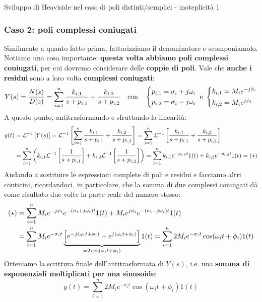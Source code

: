 \begin{defin}{Sviluppo di Heaviside nel caso di poli distinti/semplici - moteplicità 1}{}
\subsubsection{Caso 2: poli complessi coniugati}
Similmente a quanto fatto prima, fattorizziamo il denominatore e scomponiamolo. Notiamo una cosa importante: \textbf{questa volta abbiamo poli complessi coniugati}, per cui dovremo considerare delle \textbf{coppie di poli}. Vale che \textbf{anche i residui} sono a loro volta \textbf{complessi coniugati}:
\begin{equation}
Y(s) = \frac{N(s)}{D(s)} = \sum_{i=1}^n \frac{k_{i,1}}{s+p_{i,1}} + \frac{k_{i,2}}{s+p_{i,2}} \quad \textrm{con} \quad \begin{dcases}p_{i,1} = \sigma_i + j\omega_i \\
	p_{i,2} = \sigma_i -j\omega_i
 \end{dcases} \ \textrm{e} \ \begin{dcases}
 k_{i,1} = M_i e^{-j\phi_i} \\
k_{i,2} = M_i e^{j\phi_i}
 \end{dcases}
\end{equation}
A questo punto, antitrasformando e sfruttando la linearità:
\begin{align*}
y(t) & = \mathcal{L}^{-1}\left[ Y(s) \right] = \mathcal{L}^{-1}\left[ \sum_{i=1}^n \frac{k_{i,1}}{s+p_{i,1}} + \frac{k_{i,2}}{s+p_{i,2}} \right] = \sum_{i=1}^n \mathcal{L}^{-1}\left[ \frac{k_{i,1}}{s+p_{i,1}} + \frac{k_{i,2}}{s+p_{i,2}} \right] \\ & = \sum_{i=1}^n \left( k_{i,1}\mathcal{L}^{-1}\left[ \frac{1}{s+p_{i,1}} \right] + k_{i,2}\mathcal{L}^{-1}\left[ \frac{1}{s+p_{i,2}} \right] \right) = \sum_{i=1}^n k_{i,1} e^{-p_{i,1}t}1(t)+k_{i,2}e^{-p_{i,2}t}1(t) = (\star)
\end{align*}
Andando a sostituire le espressioni complete di poli e residui e facciamo altri conticini, ricordandoci, in particolare, che la somma di due complessi coniugati dà come risultato due volte la parte reale del numero stesso:
\begin{align*}
(\star) & = \sum_{i=1}^n M_ie^{-j\phi_i} e^{-(\sigma_i + j\omega_i)t}1(t)+M_ie^{j\phi_i} e^{-(\sigma_i - j\omega_i)t}1(t) \\ & = \sum_{i=1}^n M_i e^{-\sigma_it}\underbrace{\left[ e^{- j(\omega_it + \phi_i)}+e^{j(\omega_it + \phi_i)} \right]}_{=2\cos(\omega_i t + \phi_i)}1(t) = \sum_{i=1}^n 2M_i e^{-\sigma_it} \cos(\omega_i t + \phi_i)1(t)
\end{align*}
Otteniamo la scrittura finale dell'antitrasformata di $Y(s)$, i.e. una \textbf{somma di esponenziali moltiplicati per una sinusoide}:
\begin{equation}
\label{eq:heavi_compcon}
\boxed{y(t) = \sum_{i=1}^n 2M_i e^{-\sigma_it} \cos(\omega_i t + \phi_i)1(t)}
\end{equation}
\end{defin}
